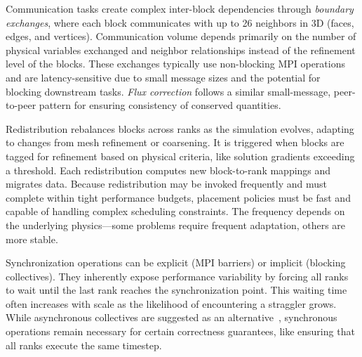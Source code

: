 \enlargethispage{-\baselineskip}

Communication tasks create complex inter-block dependencies through \emph{boundary exchanges},
where each block communicates with up to 26 neighbors in 3D (faces, edges, and vertices).
Communication volume depends primarily on the number of physical variables exchanged and neighbor
relationships instead of the refinement level of the blocks.
These exchanges typically use non-blocking MPI operations and are latency-sensitive due to small
message sizes and the potential for blocking downstream tasks.
\emph{Flux correction} follows a similar small-message, peer-to-peer pattern for ensuring consistency of
conserved quantities.

Redistribution rebalances blocks across ranks as the simulation evolves, adapting to
changes from mesh refinement or coarsening.
It is triggered when blocks are tagged for refinement based on physical criteria, like solution
gradients exceeding a threshold.
Each redistribution computes new block-to-rank mappings and migrates data.
Because redistribution may be invoked frequently and must complete within tight performance
budgets, placement policies must be fast and capable of handling complex scheduling constraints.
The frequency depends on the underlying physics---some problems require frequent adaptation,
others are more stable.

Synchronization operations can be explicit (MPI barriers) or implicit (blocking collectives).
They inherently expose performance variability by forcing all ranks to wait until the last rank
reaches the synchronization point.
This waiting time often increases with scale as the likelihood of encountering a straggler grows.
While asynchronous collectives are suggested as an alternative~\cite{Hoefl2007:CaseAsyncColl},
synchronous operations remain necessary for certain correctness guarantees, like ensuring that 
all ranks execute the same timestep.